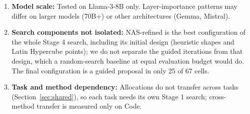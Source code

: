 \documentclass[11pt]{article}
\begin{document}
\begin{enumerate}
\item \textbf{Model scale:} Tested on Llama-3-8B only. Layer-importance patterns may differ on larger models (70B+) or other architectures (Gemma, Mistral).
\item \textbf{Search components not isolated:} NAS-refined is the best configuration of the whole Stage 4 search, including its initial design (heuristic shapes and Latin Hypercube points); we do not separate the guided iterations from that design, which a random-search baseline at equal evaluation budget would do. The final configuration is a guided proposal in only 25 of 67 cells.
\item \textbf{Task and method dependency:} Allocations do not transfer across tasks (Section~\ref{sec:shared}), so each task needs its own Stage 1 search; cross-method transfer is measured only on Code.
\end{enumerate}

\FloatBarrier




\end{document}
